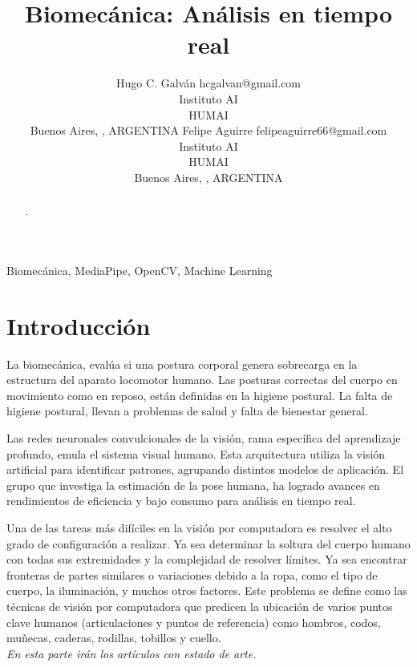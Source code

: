 \documentclass[twoside,11pt]{article}
\begin{document}
\title{Biomecánica: Análisis en tiempo real}

\author{\name Hugo C. Galván \email hcgalvan@gmail.com \\
       \addr Instituto AI\\
       HUMAI\\
       Buenos Aires, , ARGENTINA
       \AND
       \name Felipe Aguirre \email felipeaguirre66@gmail.com \\
       \addr Instituto AI\\
       HUMAI\\
       Buenos Aires, , ARGENTINA}

\editor{ }

\maketitle

\begin{abstract}%
.
\end{abstract}

\begin{keywords}
  Biomecánica, MediaPipe, OpenCV, Machine Learning
\end{keywords}

\section{Introducción}

La biomecánica, evalúa si una postura corporal genera sobrecarga 
en la estructura del aparato locomotor humano. 
Las posturas correctas del cuerpo en movimiento como en reposo, 
están definidas en la higiene postural. La falta de higiene postural, 
llevan a problemas de salud y falta de bienestar general.

Las redes neuronales convulcionales de la visión, rama específica del aprendizaje 
profundo, emula el sistema visual humano. Esta arquitectura utiliza 
la visión artificial para identificar patrones, agrupando distintos 
modelos de aplicación. El grupo que investiga la estimación de la pose
 humana, ha logrado avances en rendimientos de eficiencia y bajo consumo
 para análisis en tiempo real.

 Una de las tareas más difíciles en la visión por computadora 
 es resolver el alto grado de configuración a realizar. 
 Ya sea determinar la soltura del cuerpo humano con todas sus extremidades
  y la complejidad de resolver límites. 
Ya sea encontrar fronteras de partes similares o variaciones debido 
a la ropa, como el tipo de cuerpo, la iluminación, y muchos otros factores. 
Este problema se define como las técnicas de visión por computadora 
que predicen la ubicación de varios puntos clave humanos (articulaciones y puntos de referencia)
 como hombros, codos, muñecas, caderas, rodillas, tobillos y cuello.\\
 {\noindent \em En esta parte irán los artículos con estado de arte.}\\
\end{document}
